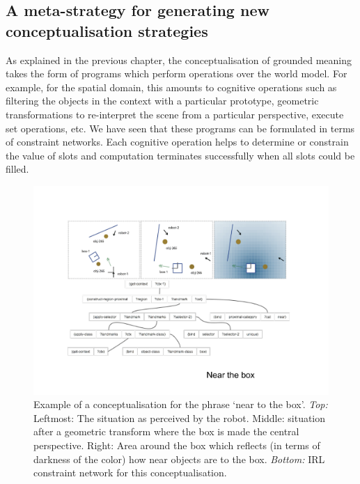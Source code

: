 \subsection{A meta-strategy for generating new conceptualisation strategies}

As explained in the previous chapter, the conceptualisation of grounded meaning takes the form of programs which perform 
operations over the world model. For example, for the spatial domain, this amounts to
cognitive operations such as filtering the objects in the context with a particular prototype, geometric 
transformations to re-interpret the scene from a particular perspective, execute set operations, etc. We have seen that these 
programs can be formulated in terms of constraint networks. Each cognitive operation helps to determine or constrain
the value of slots and computation terminates successfully when all slots could be filled. 


\begin{figure}
\centerline{\includegraphics[width=.9\linewidth]{chap11/figs/near-the-box2.pdf}}
\caption{Example of a conceptualisation for the phrase `near to the box'. {\itshape Top:} 
Leftmost: The situation as perceived by the robot. Middle: situation after a geometric transform where the box is 
made the central perspective. Right: Area around the box which reflects (in terms of darkness of the color) how 
near objects are to the box. {\itshape Bottom:} IRL constraint network for this conceptualisation.
\label{fig:spatial-strategies}}
\end{figure}

